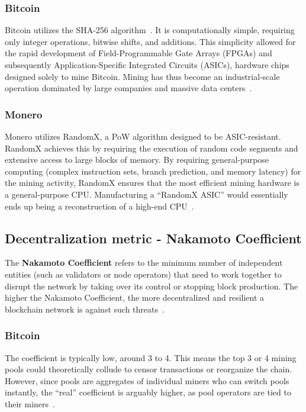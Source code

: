 \documentclass[conference]{IEEEtran}
\begin{document}
\subsubsection{Bitcoin}
Bitcoin utilizes the SHA-256 algorithm~\cite{bitcoin_paper}. It is computationally simple, requiring only integer operations, bitwise shifts, and additions. This simplicity allowed for the rapid development of Field-Programmable Gate Arrays (FPGAs) and subsequently Application-Specific Integrated Circuits (ASICs), hardware chips designed solely to mine Bitcoin. Mining has thus become an industrial-scale operation dominated by large companies and massive data centers~\cite{bitcoin_mining_centralization}.

\subsubsection{Monero}
Monero utilizes RandomX, a PoW algorithm designed to be ASIC-resistant. RandomX achieves this by requiring the execution of random code segments and extensive access to large blocks of memory. By requiring general-purpose computing (complex instruction sets, branch prediction, and memory latency) for the mining activity, RandomX ensures that the most efficient mining hardware is a general-purpose CPU. Manufacturing a ``RandomX ASIC'' would essentially ends up being a reconstruction of a high-end CPU~\cite{monero_mining}.

\subsection{Decentralization metric - Nakamoto Coefficient}
The \textbf{Nakamoto Coefficient} refers to the minimum number of independent entities (such as validators or node operators) that need to work together to disrupt the network by taking over its control or stopping block production. The higher the Nakamoto Coefficient, the more decentralized and resilient a blockchain network is against such threats~\cite{nakamoto_coefficient}.

\subsubsection{Bitcoin}
The coefficient is typically low, around 3 to 4. This means the top 3 or 4 mining pools could theoretically collude to censor transactions or reorganize the chain. However, since pools are aggregates of individual miners who can switch pools instantly, the ``real'' coefficient is arguably higher, as pool operators are tied to their miners~\cite{bitcoin_nakamoto_coefficient}.
\end{document}
